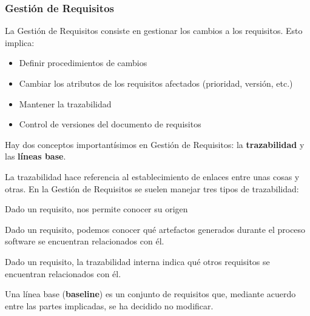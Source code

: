 \subsubsection{Gestión de Requisitos}
\label{sec:requisitos:gestion}

La Gestión de Requisitos consiste en gestionar los cambios a los
requisitos. Esto implica:

\begin{itemize}[noitemsep]
\item Definir procedimientos de cambios
\item Cambiar los atributos de los requisitos afectados (prioridad, versión, etc.)
\item Mantener la trazabilidad
\item Control de versiones del documento de requisitos
\end{itemize}

Hay dos conceptos importantísimos en Gestión de Requisitos: la \textbf{trazabilidad} y las \textbf{líneas base}.

La trazabilidad hace referencia al establecimiento de enlaces entre
unas cosas y otras. En la Gestión de Requisitos se suelen manejar tres
tipos de trazabilidad:

\begin{description}[noitemsep]
\item [Trazabilidad hacia atrás] Dado un requisito, nos permite conocer
  su origen
\item [Trazabilidad hacia delante] Dado un requisito, podemos conocer
  qué artefactos generados durante el proceso software se encuentran
  relacionados con él.
\item [Trazabilidad interna] Dado un requisito, la trazabilidad interna
  indica qué otros requisitos se encuentran relacionados con él.
\end{description}

Una línea base (\textbf{baseline}) es un conjunto de requisitos que, mediante acuerdo entre las partes
implicadas, se ha decidido no modificar.